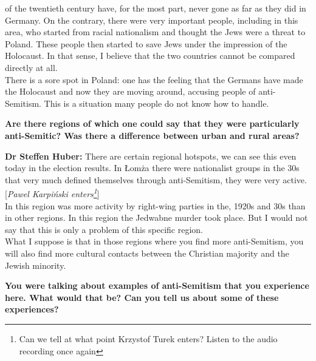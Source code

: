 of the twentieth century have, for the most part, never gone as far as they did in Germany. On the contrary, there were very important people, including in this area, who started from racial nationalism and thought the Jews were a threat to Poland. These people then started to save Jews under the impression of the Holocaust. In that sense, I believe that the two countries cannot be compared directly at all.\\
There is a sore spot in Poland: one has the feeling that the Germans have made the Holocaust and now they are moving around, accusing people of anti-Semitism. This is a situation many people do not know how to handle. 

\textbf{Are there regions of which one could say that they were particularly anti-Semitic? Was there a difference between urban and rural areas?} 

\textbf{Dr Steffen Huber:} There are certain regional hotspots, we can see this even today in the election results. In Łomża there were nationalist groups in the 30s that very much defined themselves through anti-Semitism, they were very active. [\textit{Pawel Karpiński enters\footnote{Can we tell at what point Krzystof Turek enters? Listen to the audio recording once again}}] \\
In this region was more activity by right-wing parties in the, 1920s and 30s than in other regions. In this region the Jedwabne murder took place. But I would not say that this is only a problem of this specific region.\\
What I suppose is that in those regions where you find more anti-Semitism, you will also find more cultural contacts between the Christian majority and the Jewish minority. 

\textbf{You were talking about examples of anti-Semitism that you experience here. What would that be? Can you tell us about some of these experiences?} 

